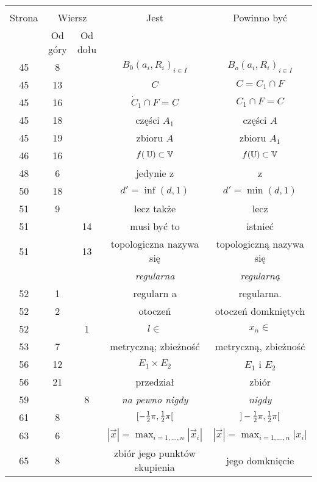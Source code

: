 \documentclass[a4paper,11pt]{article}
\newcommand{\V}{\mb{V}}
\newcommand{\U}{\mb{U}}
\newcommand{\ti}{\times}
\begin{document}
\begin{center}
  \begin{tabular}{|c|c|c|c|c|}
    \hline
    & \multicolumn{2}{c|}{} & & \\
    Strona & \multicolumn{2}{c|}{Wiersz}& Jest & Powinno być \\ \cline{2-3}
    & Od góry & Od dołu &  &  \\ \hline
    45  &  8 & & $B_{ 0 }( a_{ i }, R_{ i } )_{ i \in I }$
           & $B_{ o }( a_{ i }, R_{ i } )_{ i \in I }$ \\
    45  & 13 & & $C$ & $C = C_{ 1 } \cap F$ \\
    45  & 16 & & $\dot{ C }_{ 1 } \cap F = C$ & $C_{ 1 } \cap F = C$ \\
    45  & 18 & & części $A_{ 1 }$ & części $A$ \\
    45  & 19 & & zbioru $A$ & zbioru $A_{ 1 }$ \\
    46  & 16 & & $f( \: \U ) \subset \V$ & $f( \U ) \subset \V$ \\
    48  &  6 & & jedynie z & z \\
    50  & 18 & & $d' = \inf( d, 1 )$ & $d' = \min( d, 1 )$ \\
    51  &  9 & & lecz także & lecz \\
    51  & & 14 & musi być to & istnieć \\
    51  & & 13 & topologiczna nazywa się & topologiczną nazywa się \\
    & & & \emph{regularna} & \emph{regularną} \\
    52  &  1 & & regularn a & regularna. \\
    52  &  2 & & otoczeń & otoczeń domkniętych \\
    52  & &  1 & $l \in$ & $x_{ n } \in$ \\
    53  &  7 & & metryczną; zbieżność & metryczną, zbieżność \\
    56  & 12 & & $E_{ 1 } \ti E_{ 2 }$ & $E_{ 1 }$ i $E_{ 2 }$ \\
    56  & 21 & & przedział & zbiór \\
    59  & &  8 & \emph{na pewno nigdy} & \emph{nigdy} \\
    61  &  8 & & $[ -\frac{ 1 }{ 2 } \pi, \frac{ 1 }{ 2 } \pi [$
           & $] -\frac{ 1 }{ 2 } \pi, \frac{ 1 }{ 2 } \pi [$ \\
    63  &  6 & & $| \vec{ x } | = \max_{ i = 1, \ldots, n}
                 | \vec{ x }_{ i } |$
           & $| \vec{ x } | = \max_{ i = 1, \ldots, n} | x_{ i } |$ \\
    65  &  8 & & zbiór jego punktów skupienia & jego domknięcie \\

\end{tabular}
\end{center}
\end{document}
